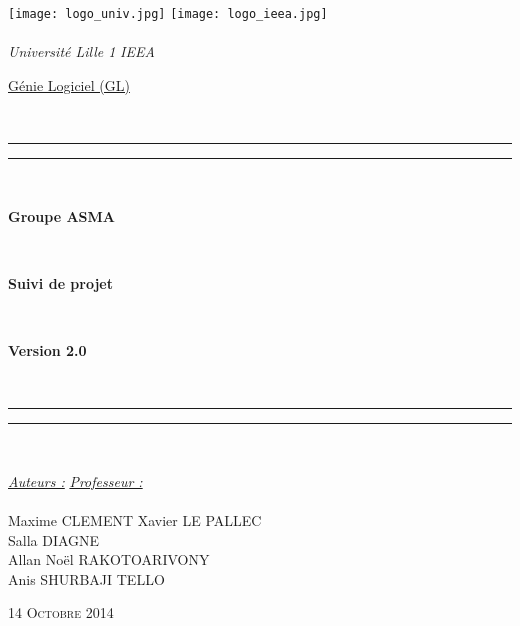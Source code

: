 \thispagestyle{cover}

\texttt{[image: logo\_univ.jpg]} \hfill \texttt{[image: logo\_ieea.jpg]} \\
~\\
\hspace*{0.5cm} {\Large \textit{Université Lille 1}} \hfill {\Large \textit{IEEA}} \hspace*{0.5cm}\\

\vspace*{12mm}

\begin{center}
	\begin{Huge} \underline{Génie Logiciel (GL)} \end{Huge}\\[4mm]

	\vspace*{15mm}

	\rule[0.5ex]{\linewidth}{2pt}\vspace*{-\baselineskip}\vspace*{3.2pt}
	\rule[0.5ex]{\linewidth}{1pt}\\[\baselineskip]

		\begin{Huge} \textbf{Groupe ASMA} \end{Huge}\\[4mm]
		\begin{Huge} \textbf{Suivi de projet} \end{Huge}\\[4mm]
		\begin{Huge} \textbf{Version 2.0} \end{Huge}\\[4mm]

	\rule[0.5ex]{\linewidth}{1pt}\vspace*{-\baselineskip}\vspace{3.2pt}
	\rule[0.5ex]{\linewidth}{2pt}\\

	\vspace*{20mm}

	{\large \textit{\underline{Auteurs :}}} \hfill {\large \textit{\underline{Professeur :}}}\\
	~\\
	{\large Maxime CLEMENT} \hfill {\large Xavier LE PALLEC}\\
	{\large Salla DIAGNE} \hfill ~\\
	{\large Allan Noël RAKOTOARIVONY} \hfill ~\\
	{\large Anis SHURBAJI TELLO} \hfill ~\\
	
	\vspace*{15mm}
	
	{\large\textsc{14 Octobre 2014}}
\end{center}